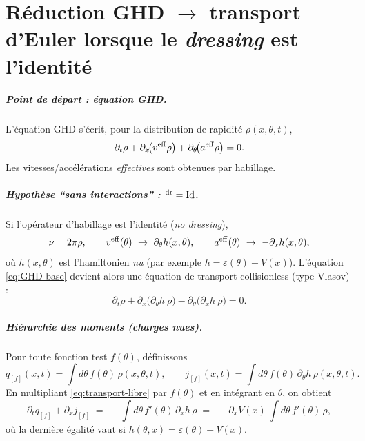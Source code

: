 \chapter{Réduction GHD $\to$ transport d’Euler lorsque le \textit{dressing} est l’identité}\label{annex:Euler}
\minitoc

\paragraph{Point de départ : équation GHD.}
L'équation \gls{GHD} s’écrit, pour la distribution de rapidité $\rho(x,\theta,t)$,
\begin{equation}\label{eq:GHD-base}
  \partial_t \rho + \partial_x\!\big(v^{\rm eff}\rho\big) + \partial_\theta\!\big(a^{\rm eff}\rho\big)=0.
\end{equation}
Les vitesses/accélérations \emph{effectives} sont obtenues par habillage.

\paragraph{Hypothèse ``sans interactions'' : $^{\rm dr}=\mathrm{Id}$.}
Si l’opérateur d’habillage est l’identité (\emph{no dressing}),
\[
\nu = 2\pi \rho, \qquad
v^{\rm eff}(\theta)\ \to\ \partial_\theta h(x,\theta),
\qquad a^{\rm eff}(\theta)\ \to\ -\partial_x h(x,\theta),
\]
où $h(x,\theta)$ est l’hamiltonien \emph{nu} (par exemple $h=\varepsilon(\theta)+V(x)$).
L’équation \eqref{eq:GHD-base} devient alors une équation de transport collisionless (type Vlasov) :
\begin{equation}\label{eq:transport-libre}
  \partial_t \rho + \partial_x\!\big( \partial_\theta h\ \rho \big)
  - \partial_\theta\!\big( \partial_x h\ \rho \big) = 0.
\end{equation}

\paragraph{Hiérarchie des moments (charges nues).}
Pour toute fonction test $f(\theta)$, définissons
\[
q_{[f]}(x,t)=\int d\theta\, f(\theta)\,\rho(x,\theta,t), \qquad
j_{[f]}(x,t)=\int d\theta\, f(\theta)\,\partial_\theta h\,\rho(x,\theta,t).
\]
En multipliant \eqref{eq:transport-libre} par $f(\theta)$ et en intégrant en $\theta$, on obtient
\begin{equation}\label{eq:conserv-f}
  \partial_t q_{[f]} + \partial_x j_{[f]}
  \;=\; - \int d\theta\, f'(\theta)\, \partial_x h\, \rho
  \;=\; -\,\partial_x V(x)\, \int d\theta\, f'(\theta)\, \rho,
\end{equation}
où la dernière égalité vaut si $h(\theta,x)=\varepsilon(\theta)+V(x)$.

